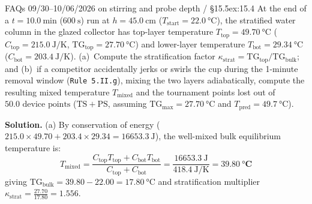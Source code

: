 \begin{twocol}[0.50]
\begin{center}
\label{fig:15:stratification-profile}
\end{center}
\nextcol[0.48]
\begin{workedexample}{FAQs 09/30--10/06/2026 on stirring and probe depth / §15.5}{ex:15.4}
At the end of a $t = \SI{10.0}{\minute}$ ($\SI{600}{\second}$) run at $h = \SI{45.0}{\centi\meter}$ ($T_{\mathrm{start}} = \SI{22.0}{\celsius}$), the stratified water column in the glazed collector has top-layer temperature $T_{\mathrm{top}} = \SI{49.70}{\celsius}$ ($C_{\mathrm{top}} = \SI{215.0}{\joule\per\kelvin}$, $\mathrm{TG}_{\mathrm{top}} = \SI{27.70}{\celsius}$) and lower-layer temperature $T_{\mathrm{bot}} = \SI{29.34}{\celsius}$ ($C_{\mathrm{bot}} = \SI{203.4}{\joule\per\kelvin}$). (a)~Compute the stratification factor $\kappa_{\mathrm{strat}} = \mathrm{TG}_{\mathrm{top}}/\mathrm{TG}_{\mathrm{bulk}}$; and (b)~if a competitor accidentally jerks or swirls the cup during the 1-minute removal window (\texttt{Rule 5.II.g}), mixing the two layers adiabatically, compute the resulting mixed temperature $T_{\mathrm{mixed}}$ and the tournament points lost out of $50.0\text{ device points}$ ($\mathrm{TS}+\mathrm{PS}$, assuming $\mathrm{TG}_{\max} = \SI{27.70}{\celsius}$ and $T_{\mathrm{pred}} = \SI{49.7}{\celsius}$).

\textbf{Solution.}
(a) By conservation of energy ($215.0\times 49.70 + 203.4\times 29.34 = \SI{16653.3}{\joule}$), the well-mixed bulk equilibrium temperature is:
\[
  T_{\mathrm{mixed}} = \frac{C_{\mathrm{top}}T_{\mathrm{top}} + C_{\mathrm{bot}}T_{\mathrm{bot}}}{C_{\mathrm{top}} + C_{\mathrm{bot}}} = \frac{\SI{16653.3}{\joule}}{\SI{418.4}{\joule\per\kelvin}} = \mathbf{\SI{39.80}{\celsius}}
\]
giving $\mathrm{TG}_{\mathrm{bulk}} = 39.80 - 22.00 = \SI{17.80}{\celsius}$ and stratification multiplier $\kappa_{\mathrm{strat}} = \frac{27.70}{17.80} = \mathbf{1.556}$.


\end{workedexample}
\end{twocol}
